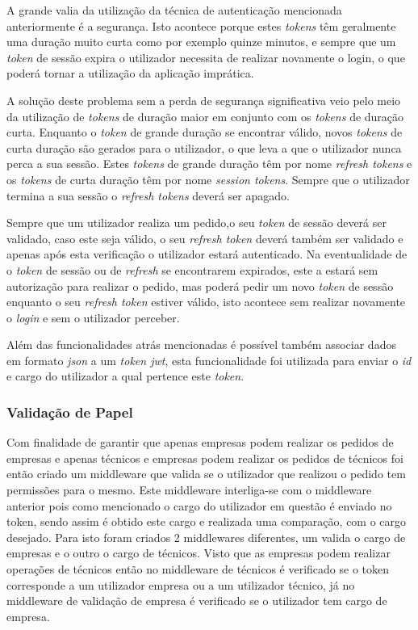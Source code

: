 A grande valia da utilização da técnica de autenticação mencionada anteriormente é a segurança. Isto acontece porque estes \textit{tokens} têm geralmente uma duração muito curta como por exemplo quinze minutos, e sempre que um \textit{token} de sessão expira o utilizador necessita de realizar novamente o login, o que poderá tornar a utilização da aplicação imprática.

A solução deste problema sem a perda de segurança significativa veio pelo meio da utilização de \textit{tokens} de duração maior em conjunto com os \textit{tokens} de duração curta. Enquanto o \textit{token} de grande duração se encontrar válido, novos \textit{tokens} de curta duração são gerados para o utilizador, o que leva a que o utilizador nunca perca a sua sessão. Estes \textit{tokens} de grande duração têm por nome \textit{refresh tokens} e os \textit{tokens} de curta duração têm por nome \textit{session tokens}. Sempre que o utilizador termina a sua sessão o \textit{refresh tokens} deverá ser apagado.

Sempre que um utilizador realiza um pedido,o seu \textit{token} de sessão deverá ser validado, caso este seja válido, o seu \textit{refresh token} deverá também ser validado e apenas após esta verificação o utilizador estará autenticado. Na eventualidade de o \textit{token} de sessão ou de \textit{refresh} se encontrarem expirados, este a estará sem autorização para realizar o pedido, mas poderá pedir um novo \textit{token} de sessão enquanto o seu \textit{refresh token} estiver válido, isto acontece sem realizar novamente o \textit{login} e sem o utilizador perceber.

 Além das funcionalidades atrás mencionadas é possível também associar dados em formato \textit{json} a um \textit{token jwt}, esta funcionalidade foi utilizada para enviar o \textit{id} e cargo do utilizador a qual pertence este \textit{token}.

 \newpage

\subsubsection{Validação de Papel}

Com finalidade de garantir que apenas empresas podem realizar os pedidos de empresas e apenas técnicos e empresas podem realizar os pedidos de técnicos foi então criado um middleware que valida se o utilizador que realizou o pedido tem permissões para o mesmo. Este middleware interliga-se com o middleware anterior pois como mencionado o cargo do utilizador em questão é enviado no token, sendo assim é obtido este cargo e realizada uma comparação, com o cargo desejado. Para isto foram criados 2 middlewares diferentes, um valida o cargo de empresas e o outro o cargo de técnicos. Visto que as empresas podem realizar operações de técnicos então no middleware de técnicos é verificado se o token corresponde a um utilizador empresa ou a um utilizador técnico, já no middleware de validação de empresa é verificado se o utilizador tem cargo de empresa.


